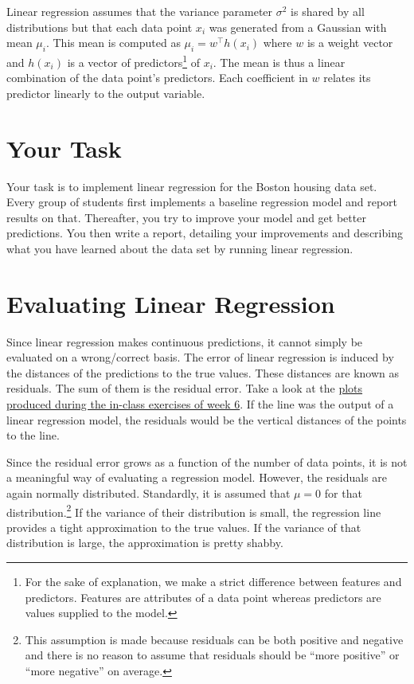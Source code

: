 \documentclass[11pt, leqno, a4paper]{article}
\begin{document}
Linear regression assumes that the variance parameter $ \sigma^{2} $ is shared by all distributions
but that each data point $ x_{i} $ was generated from a Gaussian with mean $ \mu_{i} $. This mean
is computed as $ \mu_{i} = w^{\top}h(x_{i}) $ where $ w $ is a weight vector and $ h(x_{i}) $ is
a vector of predictors\footnote{For the sake of explanation, we make a strict difference between
features and predictors. Features are attributes of a data point whereas predictors are values
supplied to the model.} of $ x_{i} $. The mean is thus a linear combination of the data point's predictors.
Each coefficient in $ w $ relates its predictor linearly to the output variable.

\section{Your Task}

Your task is to implement linear regression for the Boston housing
data set. Every group of students first implements
a baseline regression model and report results on that. Thereafter, you try to improve your 
model and get better predictions. You then write a report, detailing your improvements and 
describing what you have learned about the data set by running linear regression.

\section{Evaluating Linear Regression}

Since linear regression makes continuous predictions, it cannot simply be evaluated on a wrong/correct
basis. The error of linear regression is induced by the distances of the predictions to the true values.
These distances are known as residuals. The sum of them is the residual error. Take a look at the
\href{https://github.com/BasicProbability/InClassExercises2016/raw/master/numpy_and_matplotlib/plot.pdf}{plots produced during the in-class exercises of week 6}. If the line was the output of a linear 
regression model, the residuals would be the vertical distances of the points to the line.

Since the residual error grows as a function of the number of data points, it is not a meaningful
way of evaluating a regression model. However, the residuals are again normally distributed. Standardly,
it is assumed that $ \mu=0 $ for that distribution.\footnote{This assumption is made because
residuals can be both positive and negative and there is no reason to assume that residuals should
be ``more positive'' or ``more negative'' on average.} If the
variance of their distribution is small, the regression line provides a tight approximation to the
true values. If the variance of that distribution is large, the approximation is pretty shabby. 
\end{document}
